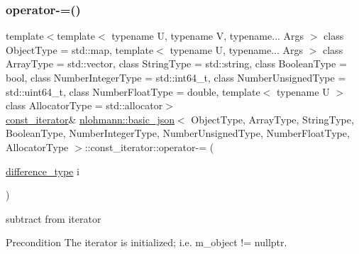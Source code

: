 \subsubsection{\texorpdfstring{operator-\/=()}{operator-=()}}
{\footnotesize\ttfamily template$<$template$<$ typename U, typename V, typename... Args $>$ class Object\+Type = std\+::map, template$<$ typename U, typename... Args $>$ class Array\+Type = std\+::vector, class String\+Type  = std\+::string, class Boolean\+Type  = bool, class Number\+Integer\+Type  = std\+::int64\+\_\+t, class Number\+Unsigned\+Type  = std\+::uint64\+\_\+t, class Number\+Float\+Type  = double, template$<$ typename U $>$ class Allocator\+Type = std\+::allocator$>$ \\
\hyperlink{classnlohmann_1_1basic__json_1_1const__iterator}{const\+\_\+iterator}\& \hyperlink{classnlohmann_1_1basic__json}{nlohmann\+::basic\+\_\+json}$<$ Object\+Type, Array\+Type, String\+Type, Boolean\+Type, Number\+Integer\+Type, Number\+Unsigned\+Type, Number\+Float\+Type, Allocator\+Type $>$\+::const\+\_\+iterator\+::operator-\/= (\begin{DoxyParamCaption}\item[{\hyperlink{classnlohmann_1_1basic__json_1_1const__iterator_a49d7c3e9ef3280df03052cce988b792f}{difference\+\_\+type}}]{i }\end{DoxyParamCaption})\hspace{0.3cm}{\ttfamily [inline]}}



subtract from iterator 

\begin{DoxyPrecond}{Precondition}
The iterator is initialized; i.\+e. {\ttfamily m\+\_\+object != nullptr}. 
\end{DoxyPrecond}
\mbox{\label{classnlohmann_1_1basic__json_1_1const__iterator_abae808b09a822cc3da4cef0efb89115d}} 
